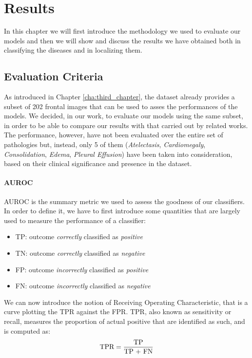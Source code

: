 \chapter{Results}
\label{cha:fifth_chapter}
In this chapter we will first introduce the methodology we used to evaluate our models and then we will show and discuss the results we have obtained both in classifying the diseases and in localizing them. 

\section{Evaluation Criteria}
\label{sec:evaluation_criteria}
As introduced in Chapter \ref{cha:third_chapter}, the dataset already provides a subset of 202 frontal images that can be used to asses the performances of the models. We decided, in our work, to evaluate our models using the same subset, in order to be able to compare our results with that carried out by related works.
The performance, however, have not been evaluated over the entire set of pathologies but, instead, only 5 of them (\textit{Atelectasis}, \textit{Cardiomegaly}, \textit{Consolidation}, \textit{Edema}, \textit{Pleural Effusion}) have been taken into consideration, based on their clinical significance and presence in the dataset. 

\subsubsection{AUROC}
\ac{AUROC} is the summary metric we used to assess the goodness of our classifiers. In order to define it, we have to first introduce some quantities that are largely used to measure the performance of a classifier:
\begin{itemize}
    \item \ac{TP}: outcome \textit{correctly} classified as \textit{positive}
    \item \ac{TN}: outcome \textit{correctly} classified as \textit{negative}
    \item \ac{FP}: outcome \textit{incorrectly} classified as \textit{positive}
    \item \ac{FN}: outcome \textit{incorrectly} classified as \textit{negative}
\end{itemize}

We can now introduce the notion of Receiving Operating Characteristic, that is a curve plotting the \ac{TPR} against the \ac{FPR}. \ac{TPR}, also known as sensitivity or recall, measures the proportion of actual positive that are identified as such, and is computed as:
\begin{equation}
\textup{TPR} = \frac{\textup{TP}}{\textup{TP + FN}}
    \label{eq:equation_5.1}
\end{equation}

